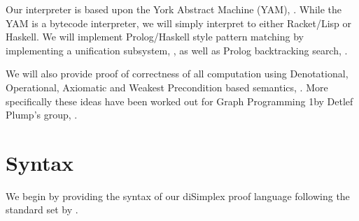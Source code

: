 Our interpreter is based upon the York Abstract Machine (YAM),
\cite{manningPlump2008yorkMachine}. While the YAM is a bytecode interpreter, we
will simply interpret to either Racket/Lisp or Haskell. We will implement
Prolog/Haskell style pattern matching by implementing a unification subsystem,
\cite[section
30.5.1]{krishnamurthi2007programmingLanguagesApplicationInterpretation}, as well
as Prolog backtracking search,
\cite[34.1.1]{krishnamurthi2007programmingLanguagesApplicationInterpretation}.

We will also provide proof of correctness of all computation using Denotational,
Operational, Axiomatic and Weakest Precondition based semantics,
\cite{gunter1992semainticProgrammingLanguages,
winskel1993formalSemanticsProgrammingLanguages, gries1981scienceProgramming,
scott1970theoryComputation, plotkin1981structuralOperationalSemantics,
hoare1969axiomaticSemantics, dijkstra1975guardedCommandsFormalDerivation}. More
specifically these ideas have been worked out for Graph Programming 1by Detlef
Plump's group, \cite{steinert2007graphProgramming,
plumpSteinert2010semanticsGraphProgramming, poskittPlump2010hoareLogic,
poskittPlump2010hoareCalculus}.

\section{Syntax}

We begin by providing the syntax of our diSimplex proof language following the
standard set by \cite{friedmanWand2008essentialsProgrammingLanguages}.

\newcommand{\MExp}[1]{& \textnormal{MExp:} & #1  \nonumber \\}
\newcommand{\denExp}[2]{\ensuremath{ \lbrack \! \lbrack #1 \rbrack \! \rbrack #2}}
\newcommand{\denEql}[3]{\ensuremath{ \lbrack \! \lbrack #1 \rbrack \! \rbrack #2 = #3}}
\newcommand{\Denotation}[1]{& \textnormal{Den:} & #1 \\}
\newcommand{\opExp}[3]{\ensuremath{\langle #1 , #2 \rangle \rightarrow #3}}
\newcommand{\Operational}[1]{& \textnormal{Oper:} & %
 \begin{minipage}{6cm} \begin{prooftree} #1 \end{prooftree} \end{minipage} \nonumber \\}
\newcommand{\Axiomatic}[1]{& \textnormal{Axiom:} & %
 \begin{minipage}{6cm} \begin{prooftree} #1 \end{prooftree} \end{minipage} \nonumber }

